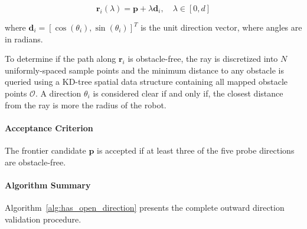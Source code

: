 \documentclass[11pt]{article}
\begin{document}
\begin{equation}
	\mathbf{r}_i(\lambda) = \mathbf{p} + \lambda \mathbf{d}_i, \quad \lambda \in [0, d]
\end{equation}

where $\mathbf{d}_i = [\cos(\theta_i), \sin(\theta_i)]^T$ is the unit direction vector, where angles are in radians.

To determine if the path along $\mathbf{r}_i$ is obstacle-free, the ray is discretized into $N$ uniformly-spaced sample points and the minimum distance to any obstacle is queried using a KD-tree spatial data structure containing all mapped obstacle points $\mathcal{O}$.  A direction $\theta_i$ is considered clear if and only if, the closest distance from the ray is more the radius of the robot.

\paragraph{Acceptance Criterion}

The frontier candidate $\mathbf{p}$ is accepted if at least three of the five probe directions are obstacle-free.

\paragraph{Algorithm Summary}

Algorithm~\ref{alg:has_open_direction} presents the complete outward direction validation procedure.
\end{document}
